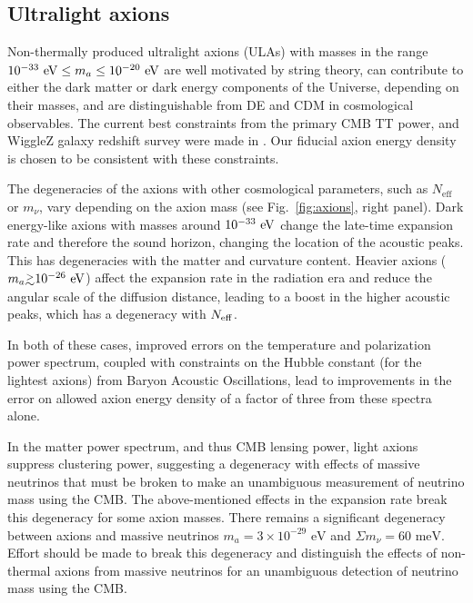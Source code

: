 \subsection{Ultralight axions}
Non-thermally produced ultralight axions (ULAs) with masses in the range $10^{-33}~{\rm eV}\leq m_{a}\leq 10^{-20}~{\rm eV}$ are well motivated by string theory, can contribute to either the dark matter or dark energy components of the Universe, depending on their masses, and are distinguishable from DE and CDM in cosmological observables. The current best constraints from the primary CMB TT power, and WiggleZ galaxy redshift survey were made in \cite{hlozek:2015axa}. Our fiducial axion energy density is chosen to be consistent with these constraints. 

The degeneracies of the axions with other cosmological parameters, such as $N_\mathrm{eff}$ or $m_\nu$, vary depending on the axion mass (see Fig.~\ref{fig:axions}, right panel). Dark energy-like axions with masses around $10^{-33}~{\rm eV}$ change the late-time expansion rate and therefore the sound horizon, changing the location of the acoustic peaks. This has degeneracies with the matter and curvature content. 
Heavier axions ($m_a \gtrsim 10^{-26}~{\rm eV}$) affect the expansion rate in the radiation era and reduce the angular scale of the diffusion distance, leading to a boost in the higher acoustic peaks, which has a degeneracy with $N_{\rm eff}$. 

In both of these cases, improved errors on the temperature and polarization power spectrum, coupled with constraints on the Hubble constant (for the lightest axions) from Baryon Acoustic Oscillations, lead to improvements in the error on allowed axion energy density of a factor of three from these spectra alone. 

In the matter power spectrum, and thus CMB lensing power, light axions suppress clustering power, suggesting a degeneracy with effects of massive neutrinos that must be broken to make an unambiguous measurement of neutrino mass using the CMB. The above-mentioned effects in the expansion rate break this degeneracy for some axion masses. There remains a significant degeneracy between axions and massive neutrinos $m_a=3\times 10^{-29}\text{ eV}$ and $\Sigma m_\nu=60\text{ meV}$. Effort should be made to break this degeneracy and distinguish the effects of non-thermal axions from massive neutrinos for an unambiguous detection of neutrino mass using the CMB. 


